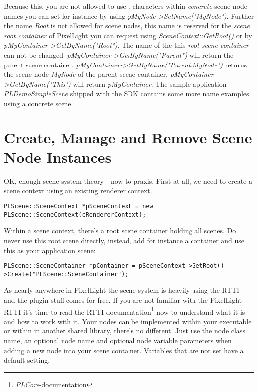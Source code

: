 Because this, you are not allowed to use \emph{.} characters within \emph{concrete} scene node names you can set for instance by using \emph{pMyNode->SetName("MyNode")}. Further the name \emph{Root} is not allowed for scene nodes, this name is reserved for the \emph{scene root container} of PixelLight you can request using \emph{SceneContext::GetRoot()} or by \emph{pMyContainer->GetByName("Root")}. The name of the this \emph{root scene container} can not be changed. \emph{pMyContainer->GetByName("Parent")} will return the parent scene container. \emph{pMyContainer->GetByName("Parent.MyNode")} returns the scene node \emph{MyNode} of the parent scene container. \emph{pMyContainer->GetByName("This")} will return \emph{pMyContainer}. The sample application \emph{PLDemoSimpleScene} shipped with the \ac{SDK} contains some more name examples using a concrete scene.




\section{Create, Manage and Remove Scene Node Instances}
OK, enough scene system theory - now to praxis. First at all, we need to create a scene context using an existing renderer context.

\begin{lstlisting}[caption=Creating a scene context instance]
PLScene::SceneContext *pSceneContext = new PLScene::SceneContext(cRendererContext);
\end{lstlisting}

Within a scene context, there's a root scene container holding all scenes. Do never use this root scene directly, instead, add for instance a container and use this as your application scene:

\begin{lstlisting}[caption=Creating a new scene container instance]
PLScene::SceneContainer *pContainer = pSceneContext->GetRoot()->Create("PLScene::SceneContainer");
\end{lstlisting}

As nearly anywhere in PixelLight the scene system is heavily using the \ac{RTTI} - and the plugin stuff comes for free. If you are not familiar with the PixelLight \ac{RTTI} it's time to read the \ac{RTTI} documentation\footnote{\emph{PLCore}-documentation} now to understand what it is and how to work with it. Your nodes can be implemented within your executable or within in another shared library, there's no different. Just use the node class name, an optional node name and optional node variable parameters when adding a new node into your scene container. Variables that are not set have a default setting.

